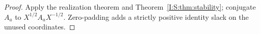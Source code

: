 \begin{proof}
Apply the realization theorem and Theorem~\ref{I:S:thm:stability}; conjugate $A_a$ to $X^{1/2}A_aX^{-1/2}$. Zero-padding adds a strictly positive identity slack on the unused coordinates.
\end{proof}
